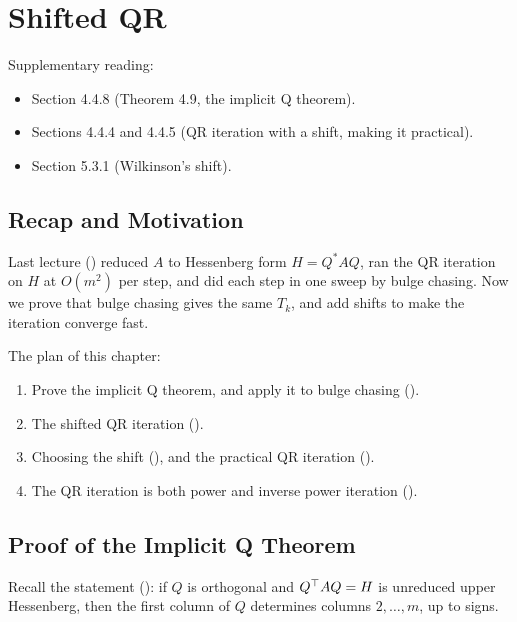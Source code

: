 \chapter{Shifted QR}
\label{ch:shifted-qr}

Supplementary reading:
\begin{itemize}
  \item \cite{Demmel} Section 4.4.8 (Theorem 4.9, the implicit Q theorem).
  \item \cite{Demmel} Sections 4.4.4 and 4.4.5 (QR iteration with a shift, making it practical).
  \item \cite{Demmel} Section 5.3.1 (Wilkinson's shift).
\end{itemize}

\section{Recap and Motivation}

Last lecture () reduced $A$ to Hessenberg form $H = Q^\ast AQ$, ran the QR iteration on $H$ at $O(m^2)$ per step, and did each step in one sweep by bulge chasing. Now we prove that bulge chasing gives the same $T_k$, and add shifts to make the iteration converge fast.

The plan of this chapter:
\begin{enumerate}
  \item Prove the implicit Q theorem, and apply it to bulge chasing ().
  \item The shifted QR iteration ().
  \item Choosing the shift (), and the practical QR iteration ().
  \item The QR iteration is both power and inverse power iteration ().
\end{enumerate}

\section{Proof of the Implicit Q Theorem}
\label{sec:implicit-q-proof}

Recall the statement (): if $Q$ is orthogonal and $Q^\top AQ = H$ is unreduced upper Hessenberg, then the first column of $Q$ determines columns $2, \dots, m$, up to signs.

